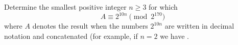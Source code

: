 Determine the smallest positive integer $n \ge 3$ for which
\[ A \equiv 2^{10n} \pmod{2^{170}} \]where $A$ denotes the result when the numbers    $2^{10n}$ are written in decimal notation and concatenated (for example, if $n=2$ we have .